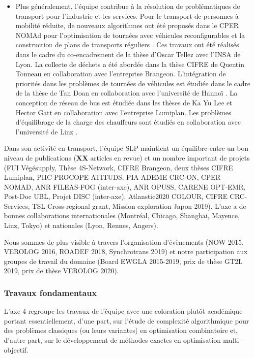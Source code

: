 \begin{itemize}
    \item Plus généralement, l'équipe contribue à la résolution de problématiques de transport pour l'industrie et les services. Pour le transport de personnes à mobilité réduite, de nouveaux algorithmes ont été proposés dans le CPER NOMAd pour l'optimisation de tournées avec véhicules reconfigurables \cite{tellez:hal-01768291} et la construction de plans de transports réguliers \cite{tellez:hal-02460670}. 
    Ces travaux ont été réalisés dans le cadre du co-encadrement de la thèse d'Oscar Tellez avec l'INSA de Lyon. 
    La collecte de déchets a été abordée dans la thèse CIFRE de Quentin Tonneau \cite{tonneau:hal-01621297, tonneau:tel-01729672} en collaboration avec l'entreprise Brangeon. 
    L'intégration de priorités dans les problèmes de  tournées de véhicules est étudiée dans le cadre de la thèse de Tan Doan en collaboration avec l'université de Hannoï \cite{}. 
    La conception de réseau de bus est étudiée dans les thèses de Ka Yu Lee \cite{lee:hal-01626949} et Hector Gatt en collaboration avec l'entreprise Lumiplan.
    Les problèmes d'équilibrage de la charge des chauffeurs sont étudiés en collaboration avec l'université de Linz \cite{lehuede:hal-02296076}.
\end{itemize}

Dans son activité en transport, l'équipe SLP maintient un équilibre entre  un bon niveau de publications (\textbf{XX} articles en revue) et un nombre important de projets (FUI Végésupply, Thèse 4S-Network, CIFRE Brangeon, deux thèses CIFRE Lumiplan, PHC PROCOPE ATITUDS, PIA ADEME CRC-ON, CPER NOMAD, ANR FILEAS-FOG (inter-axe), ANR OPUSS, CARENE OPT-EMR, Post-Doc UBL, Projet DISC (inter-axe), Atlanstic2020 COLOUR, CIFRE CRC-Services, TSL Cross-regional grant, Mission exploration Japon 2019). 
L'axe a de bonnes collaborations internationales (Montréal, Chicago, Shanghai, Mayence, Linz, Tokyo) et nationales (Lyon, Rennes, Angers). 

Nous sommes de plus visible à travers l'organisation d'évènements (NOW 2015, VEROLOG 2016, ROADEF 2018, Synchrotrans 2019) et notre participation aux groupes de travail du domaine (Board EWGLA 2015-2019, prix de thèse GT2L 2019, prix de thèse VEROLOG 2020).

\subsubsection{Travaux fondamentaux}

L'axe 4 regroupe les travaux de l'équipe avec une coloration plutôt académique portant essentiellement, d'une part, sur l'étude de complexité algorithmique pour des problèmes classiques (ou leurs variantes) en optimisation combinatoire et, d'autre part, sur le développement de méthodes exactes en optimisation multi-objectif.      


